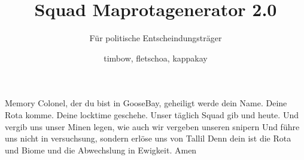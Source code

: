 \documentclass[a4paper, 11pt]{scrartcl}
\title{Squad Maprotagenerator 2.0}
\subtitle{Für politische Entscheindungsträger}
\author{timbow, fletschoa, kappakay}
\begin{document}
    
    \maketitle
    \newpage
    \tableofcontents
    \newpage

    Memory Colonel, der du bist in GooseBay, geheiligt werde dein Name.
    Deine Rota komme.
    Deine locktime geschehe.
    Unser täglich Squad gib und heute. Und vergib uns unser Minen legen, wie auch wir vergeben unseren snipern
    Und führe uns nicht in versuchsung, sondern erlöse uns von Tallil
    Denn dein ist die Rota und Biome und die Abwechslung in Ewigkeit.
    Amen

    \newpage
    \listoffigures
    \label{sec:abkuerzungverzeichnis}
    \newpage

    
    
    

    

    

    
\end{document}
